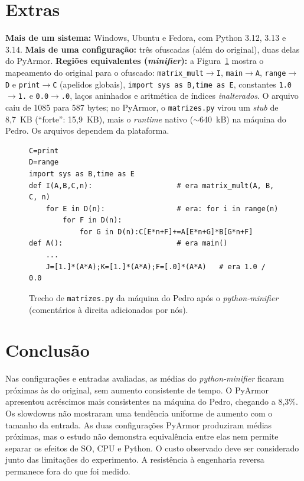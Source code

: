 \documentclass[12pt]{article}
\begin{document}
\section{Extras}
\textbf{Mais de um sistema:} Windows, Ubuntu e Fedora, com Python 3.12, 3.13 e 3.14.
\textbf{Mais de uma configuração:} três ofuscadas (além do original), duas delas do PyArmor.
\textbf{Regiões equivalentes (\emph{minifier}):} a Figura~\ref{lst:min} mostra o mapeamento do original para o ofuscado:
\texttt{matrix\_mult}$\to$\texttt{I}, \texttt{main}$\to$\texttt{A}, \texttt{range}$\to$\texttt{D} e \texttt{print}$\to$\texttt{C}
(apelidos globais), \texttt{import sys as B,time as E}, constantes \texttt{1.0}$\to$\texttt{1.} e \texttt{0.0}$\to$\texttt{.0},
laços aninhados e aritmética de índices \emph{inalterados}. O arquivo caiu de 1085 para 587 bytes; no PyArmor, o
\texttt{matrizes.py} virou um \emph{stub} de 8,7~KB (``forte'': 15,9~KB), mais o \emph{runtime} nativo (${\sim}$640~kB) na máquina do Pedro. Os arquivos dependem da plataforma.

\begin{figure}[!htbp]\centering\footnotesize
\begin{minipage}{0.9\textwidth}
\begin{verbatim}
C=print
D=range
import sys as B,time as E
def I(A,B,C,n):                    # era matrix_mult(A, B, C, n)
	for E in D(n):                 # era: for i in range(n)
		for F in D(n):
			for G in D(n):C[E*n+F]+=A[E*n+G]*B[G*n+F]
def A():                           # era main()
	...
	J=[1.]*(A*A);K=[1.]*(A*A);F=[.0]*(A*A)   # era 1.0 / 0.0
\end{verbatim}
\end{minipage}
\caption{Trecho de \texttt{matrizes.py} da máquina do Pedro após o \emph{python-minifier} (comentários à direita adicionados por nós).}\label{lst:min}
\end{figure}

\section{Conclusão}
Nas configurações e entradas avaliadas, as médias do \emph{python-minifier} ficaram próximas às do original,
sem aumento consistente de tempo. O PyArmor apresentou acréscimos mais consistentes na máquina do Pedro,
chegando a 8,3\%. Os slowdowns não mostraram uma tendência uniforme de aumento com o tamanho da entrada.
As duas configurações PyArmor produziram médias próximas, mas o estudo não demonstra equivalência entre
elas nem permite separar os efeitos de SO, CPU e Python. O custo observado deve ser considerado junto das
limitações do experimento. A resistência à engenharia reversa permanece fora do que foi medido.
\end{document}
